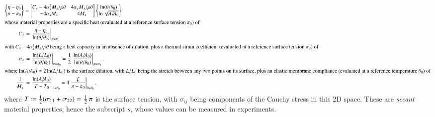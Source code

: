 \begin{subequations}
    \label{uniformGreenCEs}
    \begin{align}
        \left\{ \begin{matrix}
            \eta - \eta_0 \\ \pi - \pi_0
        \end{matrix} \right\} & = \begin{bmatrix}
            C_s - 4 \alpha_s^2 M_s / \rho \theta & 
            4 \alpha_s M_s / \rho \theta \\
            -4 \alpha_s M_s & 4 M_s
        \end{bmatrix} \left\{ \begin{matrix}
            \ln ( \theta / \theta_0 ) \\
            \ln \sqrt{ A / \! A_0 }
        \end{matrix} \right\} 
        \label{uniformGreenMembrane} \\
        \intertext{whose material properties are a specific heat (evaluated at a reference surface tension $\pi_0$) of}
        C_s & \defeq \left. \frac{\eta - \eta_0}
        {\ln ( \theta / \theta_0 )} \right|_{\pi = \pi_0} 
        \label{membraneSpecificHeat} \\
        \intertext{with $C_s - 4 \alpha_s^2 M_s / \rho \theta$ being a heat capacity in an absence of dilation, plus a thermal strain coefficient (evaluated at a reference surface tension $\pi_0$) of}
        \alpha_s & \defeq \left. \frac{\ln (L / L_0)}
        {\ln ( \theta / \theta_0 )} \right|_{\pi = \pi_0} = 
        \frac{1}{2}\left. \frac{\ln (A / \! A_0)}
        {\ln ( \theta / \theta_0 )} \right|_{\pi = \pi_0} , 
        \label{membraneThermalStraining} \\
        \intertext{where $\ln (A / \!A_0) = 2 \ln (L / L_0)$ is the surface dilation, with $L/L_0$ being the stretch between any two points on its surface, plus an elastic membrane compliance (evaluated at a reference temperature $\theta_0$) of}
        \frac{1}{M_s} & \defeq \left. \frac{\ln (A / \! A_0)}{T-T_0}
        \right|_{\theta = \theta_0} = 
        4 \left. \frac{\xi}{\pi - \pi_0} 
        \right|_{\theta = \theta_0} ,
    \end{align}
\end{subequations}
where $T \defeq \tfrac{1}{2} ( \sigma_{11} + \sigma_{22} ) \eqdef \tfrac{1}{2} \, \pi$ is the surface tension, with $\sigma_{ij}$ being components of the Cauchy stress in this 2D space.  These are \textit{secant\/} material properties, hence the subscript $s$, whose values can be measured in experiments.

